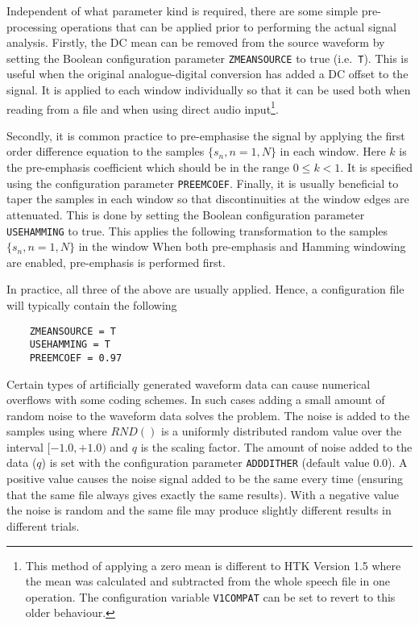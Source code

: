 Independent of what parameter kind is required, there are some simple
pre-processing operations that can be applied prior to performing the actual
signal analysis. 
Firstly, the DC mean can be removed from the source waveform by setting the
Boolean configuration parameter
\texttt{ZMEANSOURCE} to true 
(i.e.\ \texttt{T}). This is useful when
the original analogue-digital conversion has added a DC offset to the
signal. It is applied to each window individually so that it can be
used both when reading from a file and when using direct audio
input\footnote{ This method of applying a zero mean is different to
HTK Version 1.5 where the mean was calculated and subtracted from the
whole speech file in one operation. The configuration variable
\texttt{V1COMPAT} can be set to revert to this older behaviour.}.

Secondly,  it is common practice to pre-emphasise
the signal by applying the first order difference equation
to the samples
$\{s_n, n=1,N \}$ in each window.  Here $k$ is the
pre-emphasis coefficient which should be in the range
$0 \leq k < 1$.  It is specified using the configuration
parameter \texttt{PREEMCOEF}.
Finally,
it is usually beneficial to taper the
samples in each window so that discontinuities at the window
edges are attenuated.  This is done by setting the
Boolean configuration 
parameter \texttt{USEHAMMING}
to true.
This applies the following transformation to the samples
$\{s_n, n=1,N\}$ in the window
When both pre-emphasis and Hamming windowing are enabled,
pre-emphasis is performed 
first. 

In practice, all three of the above are usually applied.
Hence, a configuration file will typically contain the 
following
\begin{verbatim}
    ZMEANSOURCE = T
    USEHAMMING = T
    PREEMCOEF = 0.97
\end{verbatim}
Certain types of artificially generated waveform data can cause numerical
overflows with some coding schemes. In such cases adding a small amount of
random noise to the waveform data solves the problem. The noise is added
to the samples using
where $RND()$ is a uniformly distributed random value over the interval
$[-1.0, +1.0)$ and $q$ is the scaling factor. The amount of noise added 
to the data ($q$) is set with the configuration parameter
\texttt{ADDDITHER} (default value $0.0$). 
A positive value causes the noise signal added to be the same every time
(ensuring that the same file always gives exactly the same results). With a
negative value the noise is random and the same file may produce slightly
different results in different trials.

